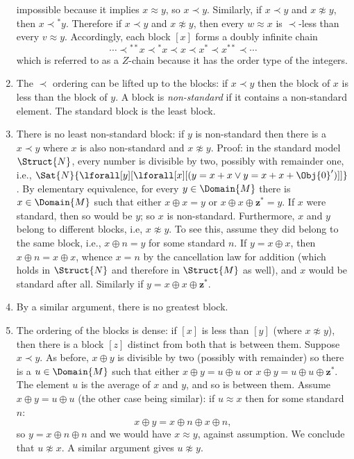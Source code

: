 \documentclass[../../../include/open-logic-section]{subfiles}
\begin{document}
\begin{enumerate}
  impossible because it implies $x \approx y$, so $x \prec
  y$. Similarly, if $x \prec y$ and $x \not\approx y$, then $x \prec
  {^*y}$. Therefore if $x \prec y$ and $x \not\approx y$, then every
  $w \approx x$ is $\prec$-less than every $v \approx y$. Accordingly,
  each block $[x]$ forms a doubly infinite chain
  \[
  \cdots \prec  {^{**}x} \prec {^*}x \prec x \prec x^* \prec x^{**}
  \prec \cdots
  \]
  which is referred to as a $Z$-chain because it has the order type of
  the integers.
\item The $\prec$ ordering can be lifted up to the blocks: if $x \prec y$
  then the block of $x$ is less than the block of $y$. A block is
  \emph{non-standard} if it contains a non-standard element. The
  standard block is the least block. 
\item There is no least non-standard block: if $y$ is non-standard
  then there is a $x \prec y$ where $x$ is also non-standard and $x
  \not\approx y$. Proof: in the standard model $\Struct{N}$, every
  number is divisible by two, possibly with remainder one, i.e.,
  $\Sat{N}{\lforall[y][\lforall[x][(y = x + x \lor y = x + x +
        \Obj{0}')]]}$. By elementary equivalence, for every $y \in
  \Domain{M}$ there is $x \in \Domain{M}$ such that either $x \oplus x
  = y$ or $x \oplus x \oplus \mathbf{z}^*= y$. If $x$ were standard,
  then so would be $y$; so $x$ is non-standard. Furthermore, $x$ and
  $y$ belong to different blocks, i.e, $x \not\approx y$.  To see
  this, assume they did belong to the same block, i.e., $x \oplus n =
  y$ for some standard $n$. If $y = x \oplus x$, then $x \oplus n = x
  \oplus x$, whence $x = n$ by the cancellation law for addition
  (which holds in $\Struct{N}$ and therefore in $\Struct{M}$ as well),
  and $x$ would be standard after all. Similarly if $y = x \oplus x
  \oplus \mathbf{z}^*$.
\item By a similar argument, there is no greatest block. 
\item The ordering of the blocks is dense: if $[x]$ is less than $[y]$
  (where $x \not\approx y$), then there is a block $[z]$ distinct from
  both that is between them. Suppose $x \prec y$. As before, $x \oplus
  y$ is divisible by two (possibly with remainder) so there is a $u
  \in \Domain{M}$ such that either $x \oplus y = u \oplus u$ or $x
  \oplus y = u \oplus u \oplus \mathbf{z}^*$. The element $u$ is the
  average of $x$ and $y$, and so is between them. Assume $x \oplus y =
  u \oplus u$ (the other case being similar): if $u \approx x$ then
  for some standard $n$:
  \[
  x \oplus y = x \oplus n \oplus x \oplus n,
  \]
  so $y = x \oplus n \oplus n$ and we would have $x \approx y$,
  against assumption. We conclude that $u \not\approx x$. A similar
  argument gives $u \not\approx y$.
\end{enumerate}
\end{document}
